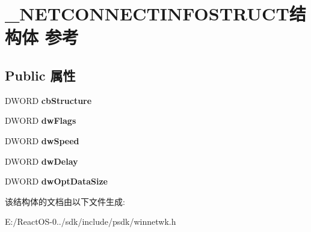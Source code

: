\hypertarget{struct___n_e_t_c_o_n_n_e_c_t_i_n_f_o_s_t_r_u_c_t}{}\section{\+\_\+\+N\+E\+T\+C\+O\+N\+N\+E\+C\+T\+I\+N\+F\+O\+S\+T\+R\+U\+C\+T结构体 参考}
\label{struct___n_e_t_c_o_n_n_e_c_t_i_n_f_o_s_t_r_u_c_t}
\subsection*{Public 属性}
\begin{DoxyCompactItemize}
\item 
\mbox{\label{struct___n_e_t_c_o_n_n_e_c_t_i_n_f_o_s_t_r_u_c_t_afbcf635acde63d6c35a2de1215fd7e9d}} 
D\+W\+O\+RD {\bfseries cb\+Structure}
\item 
\mbox{\label{struct___n_e_t_c_o_n_n_e_c_t_i_n_f_o_s_t_r_u_c_t_a8c4decd8c284b4c1ce6f15392563acd3}} 
D\+W\+O\+RD {\bfseries dw\+Flags}
\item 
\mbox{\label{struct___n_e_t_c_o_n_n_e_c_t_i_n_f_o_s_t_r_u_c_t_acefbed8726f0bb653257cdebe4b70d4a}} 
D\+W\+O\+RD {\bfseries dw\+Speed}
\item 
\mbox{\label{struct___n_e_t_c_o_n_n_e_c_t_i_n_f_o_s_t_r_u_c_t_adc1d4ab39bdd986cd81988ac5b76e653}} 
D\+W\+O\+RD {\bfseries dw\+Delay}
\item 
\mbox{\label{struct___n_e_t_c_o_n_n_e_c_t_i_n_f_o_s_t_r_u_c_t_a8053ab973353a277ec4583779ee46d4d}} 
D\+W\+O\+RD {\bfseries dw\+Opt\+Data\+Size}
\end{DoxyCompactItemize}


该结构体的文档由以下文件生成\+:\begin{DoxyCompactItemize}
\item 
E\+:/\+React\+O\+S-\/0../sdk/include/psdk/winnetwk.\+h\end{DoxyCompactItemize}

